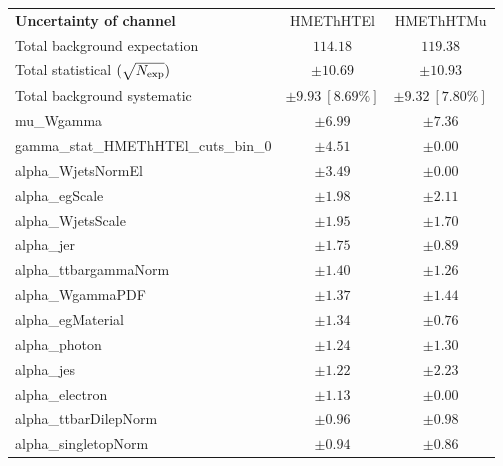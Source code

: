 
\begin{table}
\begin{center}
\setlength{\tabcolsep}{0.0pc}
\begin{tabular*}{\textwidth}{@{\extracolsep{\fill}}lcc}
\noalign{\smallskip}\hline\noalign{\smallskip}
{\bf Uncertainty of channel}                                    & HMEThHTEl            & HMEThHTMu            \\
\noalign{\smallskip}\hline\noalign{\smallskip}
Total background expectation             &  $114.18$        &  $119.38$       \\
\noalign{\smallskip}\hline\noalign{\smallskip}
Total statistical $(\sqrt{N_{\rm exp}})$              & $\pm 10.69$        & $\pm 10.93$       \\
Total background systematic               & $\pm 9.93\ [8.69\%] $        & $\pm 9.32\ [7.80\%] $             \\
\noalign{\smallskip}\hline\noalign{\smallskip}
\noalign{\smallskip}\hline\noalign{\smallskip}
mu\_Wgamma         & $\pm 6.99$          & $\pm 7.36$       \\
gamma\_stat\_HMEThHTEl\_cuts\_bin\_0         & $\pm 4.51$          & $\pm 0.00$       \\
alpha\_WjetsNormEl         & $\pm 3.49$          & $\pm 0.00$       \\
alpha\_egScale         & $\pm 1.98$          & $\pm 2.11$       \\
alpha\_WjetsScale         & $\pm 1.95$          & $\pm 1.70$       \\
alpha\_jer         & $\pm 1.75$          & $\pm 0.89$       \\
alpha\_ttbargammaNorm         & $\pm 1.40$          & $\pm 1.26$       \\
alpha\_WgammaPDF         & $\pm 1.37$          & $\pm 1.44$       \\
alpha\_egMaterial         & $\pm 1.34$          & $\pm 0.76$       \\
alpha\_photon         & $\pm 1.24$          & $\pm 1.30$       \\
alpha\_jes         & $\pm 1.22$          & $\pm 2.23$       \\
alpha\_electron         & $\pm 1.13$          & $\pm 0.00$       \\
alpha\_ttbarDilepNorm         & $\pm 0.96$          & $\pm 0.98$       \\
alpha\_singletopNorm         & $\pm 0.94$          & $\pm 0.86$       \\

\end{tabular*}
\end{center}
\end{table}
